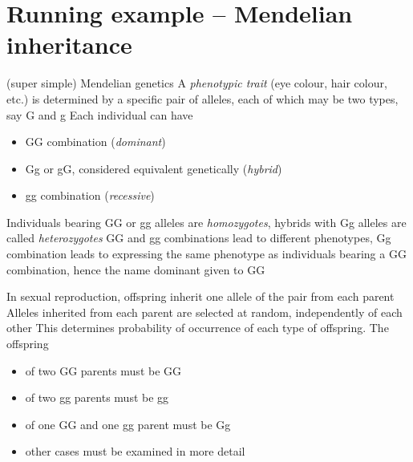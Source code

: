 \documentclass[aspectratio=169]{beamer}
\begin{document}
\section{Running example -- Mendelian inheritance}
\begin{frame}{(super simple) Mendelian genetics}
A \emph{phenotypic trait} (eye colour, hair colour, etc.) is determined by a specific pair of alleles, each of which may be two types, say G and g
\vfill
Each individual can have
\begin{itemize}
\item GG combination (\emph{dominant})
\item Gg or gG, considered equivalent genetically (\emph{hybrid})
\item gg combination (\emph{recessive})
\end{itemize}
\vfill
Individuals bearing GG or gg alleles are \emph{homozygotes}, hybrids with Gg alleles are called \emph{heterozygotes}
\vfill
GG and gg combinations lead to different phenotypes, Gg combination leads to expressing the same phenotype as individuals bearing a GG combination, hence the name dominant given to GG
\end{frame}

\begin{frame} 
In sexual reproduction, offspring inherit one allele of the pair from each parent
\vfill
Alleles inherited from each parent are selected at random, independently of each other
\vfill
This determines probability of occurrence of each type of offspring. The offspring
\begin{itemize}
\item of two GG parents must be GG
\item of two gg parents must be gg
\item of one GG and one gg parent must be Gg
\item other cases must be examined in more detail
\end{itemize}
\end{frame}
\end{document}
